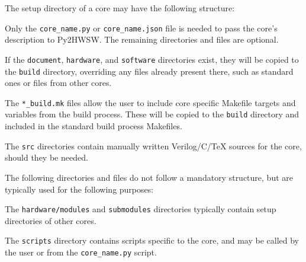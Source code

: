 %

The setup directory of a core may have the following structure:

%

Only the \texttt{core\_name.py} or \texttt{core\_name.json} file is needed to pass the core's description to Py2HWSW.
The remaining directories and files are optional.

If the \texttt{document}, \texttt{hardware}, and \texttt{software} directories exist, they will be copied to the \texttt{build} directory, overriding any files already present there, such as standard ones or files from other cores.

The \texttt{*\_build.mk} files allow the user to include core specific Makefile targets and variables from the build process.
These will be copied to the \texttt{build} directory and included in the standard build process Makefiles.

The \texttt{src} directories contain manually written Verilog/C/TeX sources for the core, should they be needed.

The following directories and files do not follow a mandatory structure, but are typically used for the following purposes:

The \texttt{hardware/modules} and \texttt{submodules} directories typically contain setup directories of other cores.

The \texttt{scripts} directory contains scripts specific to the core, and may be called by the user or from the \texttt{core\_name.py} script.
